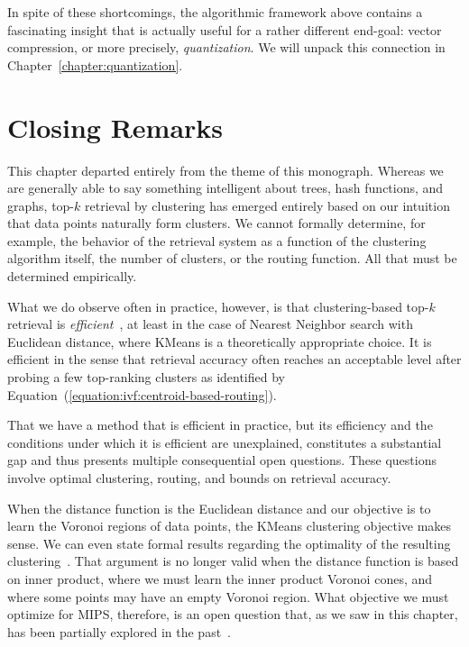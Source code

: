 In spite of these shortcomings, the algorithmic framework above contains a
fascinating insight that is actually useful for a rather different end-goal:
vector compression, or more precisely, \emph{quantization}.
We will unpack this connection in Chapter~\ref{chapter:quantization}.

\section{Closing Remarks}
This chapter departed entirely from the theme of this monograph.
Whereas we are generally able to say something intelligent about
trees, hash functions, and graphs, top-$k$ retrieval by clustering
has emerged entirely based on our intuition that data points naturally
form clusters. We cannot formally determine, for example, the behavior
of the retrieval system as a function of the clustering algorithm itself,
the number of clusters, or the routing function. All that must be determined empirically.

What we do observe often in practice, however, is that clustering-based
top-$k$ retrieval is \emph{efficient}~\citep{kmeanslsh,auvolat2015clustering,bruch2023bridging,pq},
at least in the case of Nearest Neighbor search with Euclidean distance,
where KMeans is a theoretically appropriate choice. It is efficient in the sense that
retrieval accuracy often reaches an acceptable level after probing
a few top-ranking clusters as identified by
Equation~(\ref{equation:ivf:centroid-based-routing}).

That we have a method that is efficient in practice, but
its efficiency and the conditions under which it is efficient are unexplained,
constitutes a substantial gap and thus presents multiple consequential open questions.
These questions involve optimal clustering, routing, and bounds on retrieval accuracy.

\bigskip

When the distance function is the Euclidean distance and our
objective is to learn the Voronoi regions of data points, the KMeans
clustering objective makes sense. We can even state formal results
regarding the optimality of the resulting clustering~\citep{kmeansplusplus_2007}.
That argument is no longer valid when the distance function is based on inner product,
where we must learn the inner product Voronoi cones, and where some points
may have an empty Voronoi region. What objective we must optimize for MIPS,
therefore, is an open question that, as we saw in this chapter,
has been partially explored in the past~\citep{scann}.

